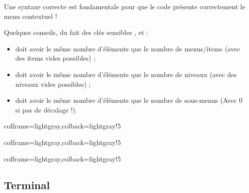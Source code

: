 \documentclass[11pt,a4paper]{ltxdoc}
\begin{document}
Une syntaxe correcte est fondamentale pour que le code présente correctement le menu contextuel !

\vspace{5mm}

Quelques conseils, du fait des \textsf{clés sensibles} ,  et  :

\begin{itemize}
	\item {} doit avoir le même nombre d'éléments que le nombre de menus/items (avec des items vides possibles) ;
	\item {} doit avoir le même nombre d'éléments que le nombre de niveaux (avec des niveaux vides possibles) ;
	\item {} doit avoir le même nombre d'éléments que le nombre de sous-menus (Avec 0 si pas de décalage !).
\end{itemize}

\begin{tcblisting}{colframe=lightgray,colback=lightgray!5}
\end{tcblisting}

\begin{tcblisting}{colframe=lightgray,colback=lightgray!5}
\end{tcblisting}

\begin{tcblisting}{colframe=lightgray,colback=lightgray!5}
\end{tcblisting}

\pagebreak

\subsection{Terminal}
\end{document}
